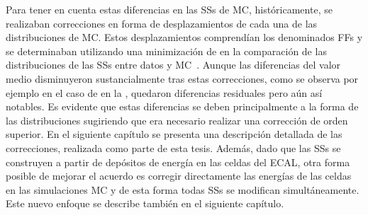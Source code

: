 Para tener en cuenta estas diferencias en las \acp{SS} de \ac{MC}, históricamente, se realizaban correcciones en forma de desplazamientos de cada una de las distribuciones de \ac{MC}. Estos desplazamientos comprendían los denominados \acfp{FF} y se determinaban utilizando una minimización de \chisq en la comparación de las distribuciones de las \acp{SS} entre datos y \ac{MC}~\cite{ATLAS-EGamma-Performance-2015-2016,ATLAS-EGamma-Performance-2015-2017}.
Aunque las diferencias del valor medio disminuyeron sustancialmente tras estas correcciones, como se observa por ejemplo en el caso de \fside en la \Fig{\ref{fig:pid_ss:ss_differences:ss:fside}}, quedaron diferencias residuales pero aún así notables.
Es evidente que estas diferencias se deben principalmente a la forma de las distribuciones sugiriendo que era necesario realizar una corrección de orden superior.
En el siguiente capítulo se presenta una descripción detallada de las correcciones, realizada como parte de esta tesis.
Además, dado que las \acp{SS} se construyen a partir de depósitos de energía en las celdas del \ac{ECAL}, otra forma posible de mejorar el acuerdo es corregir directamente las energías de las celdas en las simulaciones \ac{MC} y de esta forma todas \acp{SS} se modifican simultáneamente. Este nuevo enfoque se describe también en el siguiente capítulo.